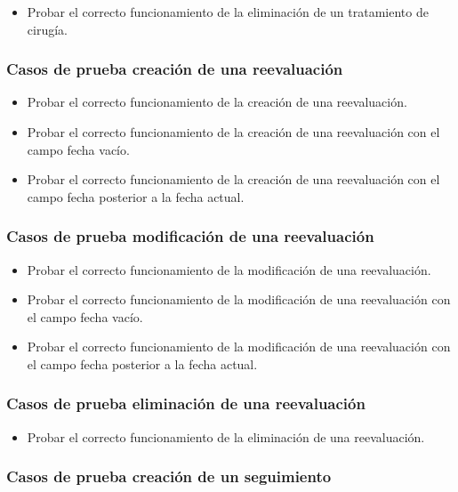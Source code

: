 \begin{itemize}
    \item Probar el correcto funcionamiento de la eliminación de un tratamiento de cirugía.
\end{itemize}

\subsubsection{Casos de prueba creación de una reevaluación}

\begin{itemize}
    \item Probar el correcto funcionamiento de la creación de una reevaluación.
    \item Probar el correcto funcionamiento de la creación de una reevaluación con el campo fecha vacío.
    \item Probar el correcto funcionamiento de la creación de una reevaluación con el campo fecha posterior a la fecha actual.
\end{itemize}

\subsubsection{Casos de prueba modificación de una reevaluación}

\begin{itemize}
    \item Probar el correcto funcionamiento de la modificación de una reevaluación.
    \item Probar el correcto funcionamiento de la modificación de una reevaluación con el campo fecha vacío.
    \item Probar el correcto funcionamiento de la modificación de una reevaluación con el campo fecha posterior a la fecha actual.
\end{itemize}

\subsubsection{Casos de prueba eliminación de una reevaluación}

\begin{itemize}
    \item Probar el correcto funcionamiento de la eliminación de una reevaluación.
\end{itemize}

\subsubsection{Casos de prueba creación de un seguimiento}

